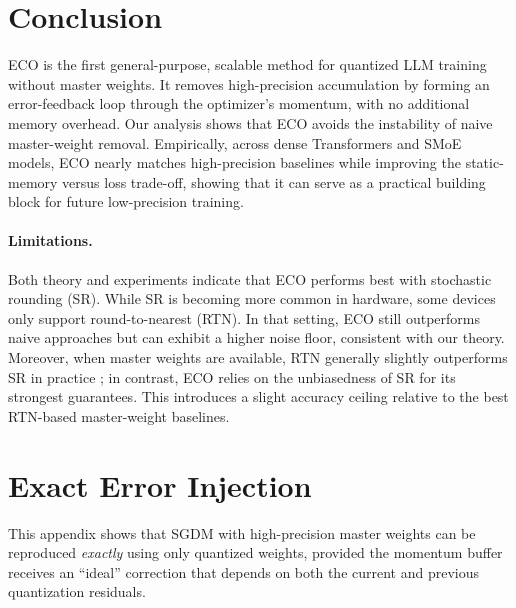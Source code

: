 \documentclass[11pt, a4paper, onecolumn, copyright, goog]{google}
\newcommand{\methodname}{ECO}
\theoremstyle{plain}
\theoremstyle{definition}
\theoremstyle{remark}
\begin{document}
\section{Conclusion}
\methodname{} is the first general-purpose, scalable method for quantized LLM training without master weights. It removes high-precision accumulation by forming an error-feedback loop through the optimizer’s momentum, with no additional memory overhead.
Our analysis shows that \methodname{} avoids the instability of naive master-weight removal. Empirically, across dense Transformers and SMoE models, \methodname{} nearly matches high-precision baselines while improving the static-memory versus loss trade-off, showing that it can serve as a practical building block for future low-precision training.
\paragraph{Limitations.}
Both theory and experiments indicate that \methodname{} performs best with stochastic rounding (SR). While SR is becoming more common in hardware, some devices only support round-to-nearest (RTN). In that setting, \methodname{} still outperforms naive approaches but can exhibit a higher noise floor, consistent with our theory. Moreover, when master weights are available, RTN generally slightly outperforms SR in practice \citep{quartet}; in contrast, \methodname{} relies on the unbiasedness of SR for its strongest guarantees. This introduces a slight accuracy ceiling relative to the best RTN-based master-weight baselines.


\appendix
\newpage

\section{Exact Error Injection}
\label{apx:exact-error-injection}

This appendix shows that SGDM with high-precision master weights can be reproduced \emph{exactly} using only quantized weights, provided the momentum buffer receives an ``ideal'' correction that depends on both the current and previous quantization residuals.
\end{document}

